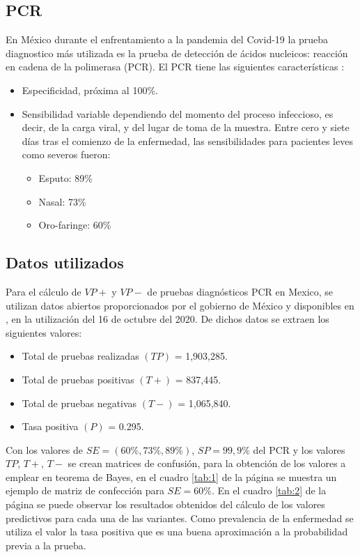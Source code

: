 \documentclass{article}
\begin{document}
\subsection{PCR}
En México durante el enfrentamiento a la pandemia del Covid-19 la prueba diagnostico más utilizada es la prueba de detección de ácidos nucleicos: reacción en cadena de la polimerasa (PCR). El PCR tiene las siguientes características \cite{Yang2020}:
\begin{itemize}
    \item Especificidad, próxima al 100\%.
    \item Sensibilidad variable dependiendo del momento del proceso infeccioso, es decir, de la carga viral, y del lugar de toma de la muestra. Entre cero y siete días tras el comienzo de la enfermedad, las sensibilidades para pacientes leves como severos fueron:
    \begin{itemize}
        \item Esputo: 89\%
        \item Nasal: 73\%
        \item Oro-faringe: 60\%
    \end{itemize}
\end{itemize}
\subsection{Datos utilizados}
Para el cálculo de $VP+$ y $VP-$ de pruebas diagnósticos PCR en Mexico, se utilizan datos abiertos proporcionados por el gobierno de México y disponibles en \cite{owidcoronavirus}, en la utilización del 16 de octubre del 2020. De dichos datos se extraen los siguientes valores:
\begin{itemize}
    \item Total de pruebas realizadas $(TP)$ = 1,903,285.
    \item Total de pruebas positivas $(T+)$ = 837,445.
    \item Total de pruebas negativas $(T-)$ = 1,065,840.
    \item Tasa positiva $(P)$ = 0.295.
\end{itemize}

Con los valores de $SE = (60\%,73\%,89\%)$, $SP = 99,9\%$ del PCR y los valores $TP$, $T+$, $T-$ se crean matrices de confusión, para la obtención de los valores a emplear en teorema de Bayes, en el cuadro \ref{tab:1} de la página  \pageref{tab:1} se muestra un ejemplo de matriz de confección para $SE = 60\%$. En el cuadro \ref{tab:2} de la página \pageref{tab:2} se puede observar los resultados obtenidos del cálculo de los valores predictivos para cada una de las variantes. Como prevalencia de la enfermedad se utiliza el valor la tasa positiva que es una buena aproximación a la probabilidad previa a la prueba.
\end{document}
